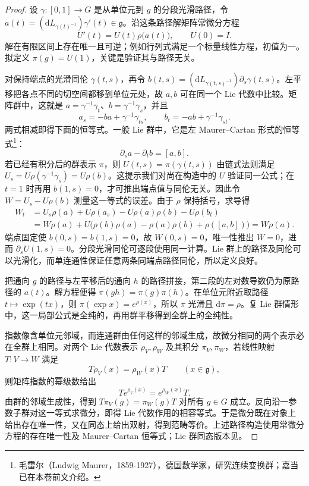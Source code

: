 \begin{proof}
	设 \(\gamma:[0,1]\to G\) 是从单位元到 \(g\) 的分段光滑路径，令 \(a(t)=(\mathrm{d}L_{\gamma(t)^{-1}})\gamma'(t)\in\mathfrak g\)。沿这条路径解矩阵常微分方程
	\[
		U'(t)=U(t)\rho\bigl(a(t)\bigr),\qquad U(0)=I.
	\]
	解在有限区间上存在唯一且可逆；例如行列式满足一个标量线性方程，初值为一。拟定义 \(\pi(g)=U(1)\)，关键是验证其与路径无关。

	对保持端点的光滑同伦 \(\gamma(t,s)\)，再令 \(b(t,s)=(\mathrm{d}L_{\gamma(t,s)^{-1}})\partial_s\gamma(t,s)\)。左平移把各点不同的切空间都移到单位元处，故 \(a,b\) 可在同一个 Lie 代数中比较。矩阵群中，这就是 \(a=\gamma^{-1}\gamma_t\)、\(b=\gamma^{-1}\gamma_s\)，并且
	\[
		a_s=-ba+\gamma^{-1}\gamma_{ts},\qquad b_t=-ab+\gamma^{-1}\gamma_{st}.
	\]
	两式相减即得下面的恒等式。一般 Lie 群中，它是左 Maurer--Cartan 形式的恒等式\footnote{毛雷尔（Ludwig Maurer，1859-1927），德国数学家，研究连续变换群；嘉当已在本卷前文介绍。}：
	\[
		\partial_s a-\partial_t b=[a,b].
	\]
	若已经有积分后的群表示 \(\pi\)，则 \(U(t,s)=\pi(\gamma(t,s))\) 由链式法则满足 \(U_s=U\rho(\gamma^{-1}\gamma_s)=U\rho(b)\)。这提示我们对尚在构造中的 \(U\) 验证同一公式；在 \(t=1\) 时再用 \(b(1,s)=0\)，才可推出端点值与同伦无关。因此令 \(W=U_s-U\rho(b)\) 测量这一等式的误差。由于 \(\rho\) 保持括号，求导得
	\[
		\begin{aligned}
			W_t&=U_s\rho(a)+U\rho(a_s)-U\rho(a)\rho(b)-U\rho(b_t)\\
			&=W\rho(a)+U\bigl(\rho(b)\rho(a)-\rho(a)\rho(b)+\rho([a,b])\bigr) =W\rho(a).
		\end{aligned}
	\]
	端点固定使 \(b(0,s)=b(1,s)=0\)，故 \(W(0,s)=0\)，唯一性推出 \(W=0\)，进而 \(\partial_sU(1,s)=0\)。分段光滑同伦可逐段使用同一计算。Lie 群上的路径及同伦可以光滑化，而单连通性保证任意两条同端点路径同伦，所以定义良好。

	把通向 \(g\) 的路径与左平移后的通向 \(h\) 的路径拼接，第二段的左对数导数仍为原路径的 \(a(t)\)。解方程便得 \(\pi(gh)=\pi(g)\pi(h)\)。在单位元附近取路径 \(t\mapsto\exp(tx)\)，则 \(\pi(\exp x)=e^{\rho(x)}\)，所以 \(\pi\) 光滑且 \(\mathrm{d}\pi=\rho\)。复 Lie 群情形中，这一局部公式是全纯的，再用群平移得到全群上的全纯性。

	指数像含单位元邻域，而连通群由任何这样的邻域生成，故微分相同的两个表示必在全群上相同。对两个 Lie 代数表示 \(\rho_V,\rho_W\) 及其积分 \(\pi_V,\pi_W\)，若线性映射 \(T:V\to W\) 满足
	\[
		T\rho_V(x)=\rho_W(x)T\qquad(x\in\mathfrak g),
	\]
	则矩阵指数的幂级数给出
	\[
		Te^{\rho_V(x)}=e^{\rho_W(x)}T.
	\]
	由群的邻域生成性，得到 \(T\pi_V(g)=\pi_W(g)T\) 对所有 \(g\in G\) 成立。反向沿一参数子群对这一等式求微分，即得 Lie 代数作用的相容等式。于是微分既在对象上给出存在唯一性，又在同态上给出双射，得到范畴等价。上述路径构造使用常微分方程的存在唯一性及 Maurer--Cartan 恒等式；Lie 群同态版本见\cite[Theorem 3.41 and Theorem 4.3]{Kirillov2008LieGroups}。
\end{proof}

